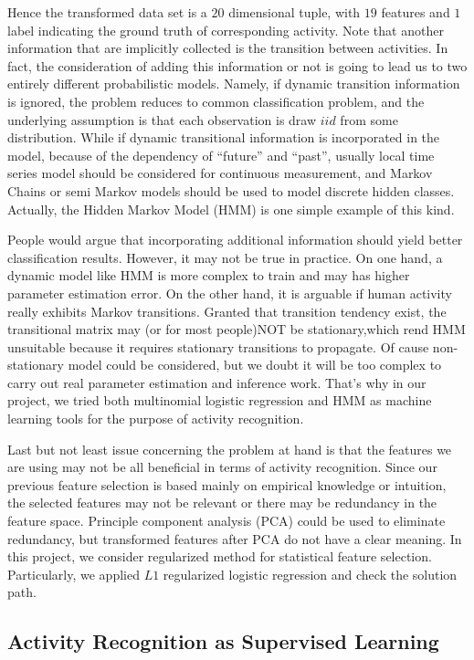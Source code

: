 Hence the transformed data set is a $20$ dimensional tuple, with $19$ features and $1$ label indicating the ground truth of corresponding activity. Note that another information that are implicitly collected is the transition between activities. In fact, the consideration of adding this information or not is going to lead us to two entirely different probabilistic models. Namely, if dynamic transition information is ignored, the problem reduces to common classification problem, and the underlying assumption is that each observation is draw $iid$ from some distribution. While if dynamic transitional information is incorporated in the model, because of the dependency of ``future'' and ``past'', usually local time series model should be considered for continuous measurement, and Markov Chains or semi Markov models should be used to model discrete hidden classes. Actually, the Hidden Markov Model (HMM) is one simple example of this kind. 

People would argue that incorporating additional information should yield better classification results. However, it may not be true in practice. On one hand, a dynamic model like HMM is more complex to train and may has higher parameter estimation error. On the other hand, it is arguable if human activity really exhibits Markov transitions. Granted that transition tendency exist, the transitional matrix may (or for most people)NOT be stationary,which rend HMM unsuitable because it requires stationary transitions to propagate. Of cause non-stationary model could be considered, but we doubt it will be too complex to carry out real parameter estimation and inference work. That's why in our project, we tried both multinomial logistic regression and HMM as machine learning tools for the purpose of activity recognition.  

Last but not least issue concerning the problem at hand is that the features we are using may not be all beneficial in terms of activity recognition. Since our previous feature selection is based mainly on empirical knowledge or intuition, the selected features may not be relevant or there may be redundancy in the feature space. Principle component analysis (PCA) could be used to eliminate redundancy, but transformed features after PCA do not have a clear meaning. In this project, we consider regularized method for statistical feature selection. Particularly, we applied $L1$ regularized logistic regression and check the solution path. 

\subsection{Activity Recognition as Supervised Learning}
\label{subsec: learning}

